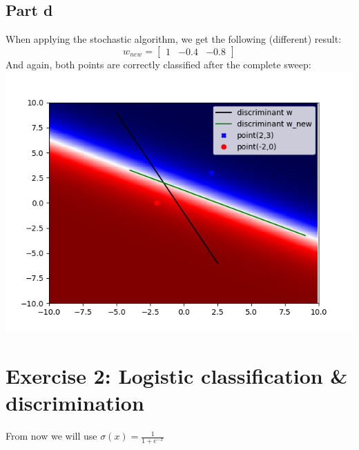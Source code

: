 \documentclass[a4paper, 10pt]{article}
\begin{document}
\subsection{Part d}
When applying the stochastic algorithm, we get the following (different) result:
$$
w_{new} = \begin{bmatrix}1 & -0.4 & -0.8\end{bmatrix}
$$
And again, both points are correctly classified after the complete sweep:
\\
\includegraphics[scale=0.6]{ex1_d.png}

\section{Exercise 2: Logistic classification \& discrimination}
From now we will use $\sigma(x)=\frac{1}{1+e^{-x}}$
\end{document}
